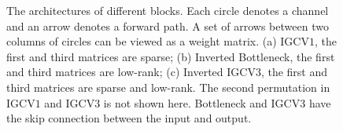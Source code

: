 \documentclass{bmvc2k}
\begin{document}
	\begin{figure}[htb!]
		\centering
		\caption{The architectures of different blocks. Each circle denotes a channel and an arrow denotes a forward path. A set of arrows between two columns of circles can be viewed as a weight matrix. (a) IGCV$1$, the first and third matrices are sparse; (b) Inverted Bottleneck, the first and third matrices are low-rank; (c) Inverted IGCV$3$, the first and third matrices are sparse and low-rank. The second permutation in IGCV$1$ and IGCV$3$ is not shown here. Bottleneck and IGCV3 have the skip connection between the input and output.}
		\label{fig:diff_arch}
	\end{figure}
\end{document}
